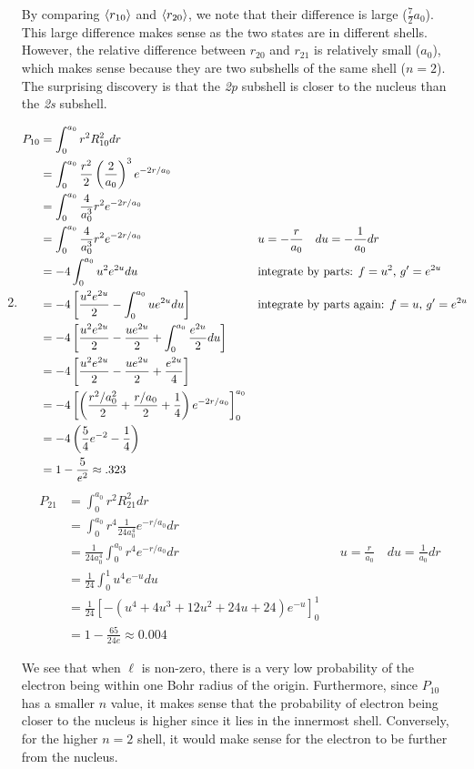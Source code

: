 \documentclass[10pt]{article}
\begin{document}
\begin{enumerate}
By comparing $ \braket{r_{10}} $ and $ \braket{r_{20}} $, we note that their difference is large ($ \frac{7}{2} a_0 $).
This large difference makes sense as the two states are in different shells.
However, the relative difference between $ r_{20} $ and $ r_{21} $ is relatively small ($ a_0 $), which makes sense because they are two subshells of the same shell ($ n=2 $).
The surprising discovery is that the \textit{2p} subshell is closer to the nucleus than the \textit{2s} subshell.

\item 
\begin{align*}
  P_{10} &= \int_{0}^{a_0} r^2 R_{10}^2 dr \\
  &= \int_{0}^{a_0} \frac{r^2}{2} \left( \frac{2}{a_0} \right)^3 e ^ {-2r /a_0} \\
  &= \int_{0}^{a_0}\frac{4}{a_0^3}r^2 e ^ {-2r / a_0} \\
  &= \int_{0}^{a_0}\frac{4}{a_0^3}r^2 e ^ {-2r / a_0} && u = -\frac{r}{a_0}\quad du = -\frac{1}{a_0}dr \\
  &= -4 \int_{0}^{a_0} u^2e ^ {2u} du && \text{integrate by parts: $ f=u^2 $, $ g'=e ^ {2u} $} \\
  &=  -4 \left[ \frac{u^2e ^ {2u}}{2} - \int_{0}^{a_0} u e ^ {2u}du \right] && \text{integrate by parts again: $ f = u $, $g' = e ^ {2u} $}\\
  &= -4 \left[ \frac{u^2e ^ {2u}}{2} - \frac{u e ^ {2u}}{2} + \int_{0}^{a_0} \frac{e ^ {2u}}{2} du \right] \\
  &= -4 \left[ \frac{u^2e ^ {2u}}{2} - \frac{u e ^ {2u}}{2} + \frac{e ^ {2u}}{4} \right] \\
  &= -4 \left[ \left( \frac{r^2/a_0^2}{2} + \frac{r/a_0 }{2} + \frac{1}{4} \right) e ^ {-2r/a_0} \right]_0^{a_0} \\
  &= -4 \left( \frac{5}{4}e ^ {-2} - \frac{1}{4} \right) \\
  &= 1- \frac{5}{e^2} \approx .323
\end{align*}
\begin{align*}
  P_{21} &= \int_{0}^{a_0}r^2R_{21}^2dr \\
         &= \int_{0}^{a_0} r^4 \frac{1}{24 a_0^4} e ^ {-r / a_0}dr \\
         &= \frac{1}{24 a_0^4}\int_{0}^{a_0} r^4 e ^ {-r / a_0}dr && u=\frac{r}{a_0} \quad du = \frac{1}{a_0}dr \\
         &= \frac{1}{24} \int_{0}^{1} u^4e ^ {-u}du \\
         &= \frac{1}{24} \left[ - \left( u^4+4u^3 + 12u^2 + 24 u + 24 \right) e ^ {-u} \right]_0^1 \\
         &= 1-\frac{65}{24e} \approx 0.004
\end{align*}

We see that when $ \ell $ is non-zero, there is a very low probability of the electron being within one Bohr radius of the origin.
Furthermore, since $ P_{10} $ has a smaller $ n $ value, it makes sense that the probability of electron being closer to the nucleus is higher since it lies in the innermost shell.
Conversely, for the higher $ n=2 $ shell, it would make sense for the electron to be further from the nucleus.

\end{enumerate}
\end{document}
